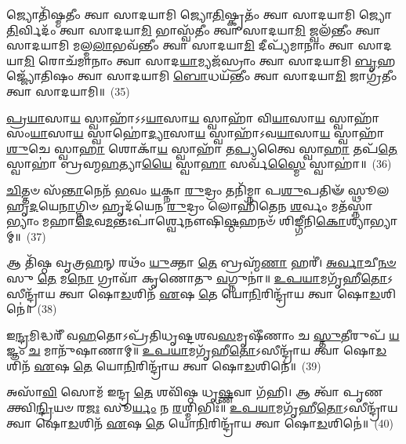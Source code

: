 {\anuvakamend[{\-\ul{𑌈}\-𑌯𑍁𑌰𑍇\-\ul{𑌕𑌾}\-𑌨𑍍𑌨𑌵𑌿𑍞᳴𑌶𑌤𑌿𑌃}]}%

𑌜𑍍𑌯𑍋𑌤𑌿᳴𑌷𑍍𑌮𑌤𑍀𑌂 𑌤𑍍𑌵𑌾 𑌸𑌾𑌦𑌯𑌾𑌮𑌿 𑌜𑍍𑌯𑍋\-\ul{𑌤𑌿}\-𑌷𑍍𑌕𑍃𑌤𑌂᳴ 𑌤𑍍𑌵𑌾 𑌸𑌾𑌦𑌯𑌾𑌮𑌿 𑌜𑍍𑌯𑍋\-\ul{𑌤𑌿}\-𑌰𑍍𑌵𑌿𑌦𑌂᳴ 𑌤𑍍𑌵𑌾 𑌸𑌾𑌦𑌯𑌾\-\ul{𑌮𑌿} 𑌭𑌾𑌸𑍍𑌵᳴𑌤𑍀𑌂 𑌤𑍍𑌵𑌾 𑌸𑌾𑌦𑌯𑌾\-\ul{𑌮𑌿} 𑌜𑍍𑌵𑌲᳴𑌨𑍍𑌤𑍀𑌂 𑌤𑍍𑌵𑌾 𑌸𑌾𑌦𑌯𑌾𑌮𑌿 𑌮𑌲𑍍𑌮\-\ul{𑌲𑌾}\-𑌭𑌵᳴𑌨𑍍𑌤𑍀𑌂 𑌤𑍍𑌵𑌾 𑌸𑌾𑌦𑌯𑌾\-\ul{𑌮𑌿} 𑌦𑍀𑌪𑍍𑌯᳴𑌮𑌾𑌨𑌾𑌂 𑌤𑍍𑌵𑌾 𑌸𑌾𑌦𑌯𑌾\-\ul{𑌮𑌿} 𑌰𑍋𑌚᳴𑌮𑌾𑌨𑌾𑌂 𑌤𑍍𑌵𑌾 𑌸𑌾𑌦\-\ul{𑌯𑌾}\-𑌮𑍍𑌯𑌜᳴𑌸𑍍𑌰𑌾𑌂 𑌤𑍍𑌵𑌾 𑌸𑌾𑌦𑌯𑌾𑌮𑌿 \ul{𑌬𑍃}\-𑌹𑌜𑍍𑌜𑍍𑌯𑍋᳴𑌤𑌿𑌷𑌂 𑌤𑍍𑌵𑌾 𑌸𑌾𑌦𑌯𑌾𑌮𑌿 \ul{𑌬𑍋}\-𑌧𑌯᳴𑌨𑍍𑌤𑍀𑌂 𑌤𑍍𑌵𑌾 𑌸𑌾𑌦𑌯𑌾\-\ul{𑌮𑌿} 𑌜𑌾𑌗𑍍𑌰᳴𑌤𑍀𑌂 𑌤𑍍𑌵𑌾 𑌸𑌾𑌦𑌯𑌾𑌮𑌿॥~(35)

{\anuvakamend[{𑌜𑍍𑌯𑍋𑌤𑌿᳴𑌷𑍍𑌮\-\ul{𑌤𑍀}\-\-\ul{𑍞} 𑌷𑌟𑍍𑌤𑍍𑌰𑌿𑍞᳴𑌶𑌤𑍍}]}%

\-\ul{𑌪𑍍𑌰}\-\-\ul{𑌯𑌾}\-𑌸𑌾\-\ul{𑌯} 𑌸𑍍𑌵𑌾𑌹𑌾᳴\-𑌽\-𑌽\-\ul{𑌯𑌾}\-𑌸𑌾\-\ul{𑌯} 𑌸𑍍𑌵𑌾𑌹𑌾᳴ 𑌵𑌿\-\ul{𑌯𑌾}\-𑌸𑌾\-\ul{𑌯} 𑌸𑍍𑌵𑌾𑌹𑌾᳴ 𑌸𑌂\-\ul{𑌯𑌾}\-𑌸𑌾\-\ul{𑌯} 𑌸𑍍𑌵𑌾𑌹𑍋॑\-\ul{𑌦𑍍𑌯𑌾}\-𑌸𑌾\-\ul{𑌯} 𑌸𑍍𑌵𑌾𑌹𑌾᳴\-𑌽𑌵\-\ul{𑌯𑌾}\-𑌸𑌾\-\ul{𑌯} 𑌸𑍍𑌵𑌾𑌹𑌾᳴ \ul{𑌶𑍁}\-𑌚𑍇 𑌸𑍍𑌵𑌾\-\ul{𑌹𑌾} 𑌶𑍋𑌕𑌾᳴\-\ul{𑌯} 𑌸𑍍𑌵𑌾𑌹𑌾᳴ 𑌤\-\ul{𑌪𑍍𑌯}\-𑌤𑍍𑌵𑍈 𑌸𑍍𑌵𑌾\-\ul{𑌹𑌾} 𑌤𑌪᳴\-\ul{𑌤𑍇} 𑌸𑍍𑌵𑌾𑌹𑌾॑ 𑌬𑍍𑌰𑌹𑍍𑌮\-\ul{𑌹}\-𑌤𑍍𑌯𑌾\-\ul{𑌯𑍈} 𑌸𑍍𑌵𑌾\-\ul{𑌹𑌾} 𑌸𑌰𑍍𑌵᳴\-\ul{𑌸𑍍𑌮𑍈} 𑌸𑍍𑌵𑌾𑌹𑌾॑॥~(36)

{\anuvakamend[{\-\ul{𑌪𑍍𑌰}\-\-\ul{𑌯𑌾}\-𑌸𑌾\-\ul{𑌯} 𑌚𑌤𑍁᳴𑌰𑍍𑌵𑌿𑍞𑌶𑌤𑌿𑌃}]}%

\-\ul{𑌚𑌿}\-𑌤𑍍𑌤𑍞 𑌸᳴\-\ul{𑌨𑍍𑌤𑌾}\-𑌨𑍇𑌨᳴ \ul{𑌭}\-𑌵𑌂 \ul{𑌯}\-𑌕𑍍𑌨𑌾 \ul{𑌰𑍁}\-𑌦𑍍𑌰𑌂 𑌤𑌨𑌿᳴𑌮𑍍𑌨𑌾 𑌪\-\ul{𑌶𑍁}\-𑌪𑌤𑌿𑍟᳴ 𑌸𑍍𑌥𑍂𑌲𑌹𑍃\-\ul{𑌦}\-𑌯𑍇\-\ul{𑌨𑌾}\-𑌗𑍍𑌨𑌿𑍞 𑌹𑍃𑌦᳴𑌯𑍇𑌨 \ul{𑌰𑍁}\-𑌦𑍍𑌰𑌂 𑌲𑍋𑌹𑌿᳴𑌤𑍇𑌨 \ul{𑌶}\-𑌰𑍍𑌵𑌂 𑌮𑌤᳴𑌸𑍍𑌨𑌾𑌭𑍍𑌯𑌾𑌂 𑌮𑌹𑌾\-\ul{𑌦𑍇}\-𑌵\-\ul{𑌮}\-𑌨𑍍𑌤𑌃𑌪𑌾॑𑌰𑍍𑌶𑍍𑌵𑍇𑌨𑍗𑌷𑌿\-\ul{𑌷𑍍𑌠}\-𑌹𑌨𑍞᳴ 𑌶𑌿𑌙𑍍𑌗𑍀𑌨𑌿\-\ul{𑌕𑍋}\-𑌶𑍍𑌯𑌾॑𑌭𑍍𑌯𑌾𑌮𑍍॥~(37)

{\anuvakamend[{\-\ul{𑌚𑌿}\-𑌤𑍍𑌤\-\ul{𑌮}\-𑌷𑍍𑌟𑌾𑌦᳴𑌶}]}%

𑌆 𑌤𑌿᳴𑌷𑍍𑌠 𑌵𑍃𑌤𑍍𑌰\-\ul{𑌹}\-𑌨𑍍 𑌰𑌥𑌂᳴ \ul{𑌯𑍁}\-𑌕𑍍𑌤𑌾 \ul{𑌤𑍇} 𑌬𑍍𑌰𑌹𑍍𑌮᳴\-\ul{𑌣𑌾} 𑌹𑌰𑍀॑। \ul{𑌅}\-\-\ul{𑌰𑍍𑌵𑌾}\-𑌚𑍀\-\ul{𑌨}\-\-\ul{𑍞} 𑌸𑍁 \ul{𑌤𑍇} 𑌮\-\ul{𑌨𑍋} 𑌗𑍍𑌰𑌾𑌵𑌾᳴ 𑌕𑍃𑌣𑍋𑌤𑍁 \ul{𑌵}\-𑌗𑍍𑌨𑍁𑌨𑌾॑॥ \ul{𑌉}\-\-\ul{𑌪}\-\-\ul{𑌯𑌾}\-𑌮𑌗𑍃᳴𑌹𑍀\-\ul{𑌤𑍋}\-\-𑌽𑌸𑍀𑌨𑍍𑌦𑍍𑌰𑌾᳴𑌯 𑌤𑍍𑌵𑌾 𑌷𑍋\-\ul{𑌡}\-𑌶𑌿𑌨᳴ \ul{𑌏}\-𑌷 \ul{𑌤𑍇} 𑌯𑍋\-\ul{𑌨𑌿}\-𑌰𑌿𑌨𑍍𑌦𑍍𑌰𑌾᳴𑌯 𑌤𑍍𑌵𑌾 𑌷𑍋\-\ul{𑌡}\-𑌶𑌿𑌨𑍇॑॥~(38)

{\anuvakamend[{𑌆 𑌤𑌿᳴\-\ul{𑌷𑍍𑌠} 𑌷𑌡𑍍𑌵𑌿𑍞᳴𑌶𑌤𑌿𑌃}]}%

𑌇\-\ul{𑌨𑍍𑌦𑍍𑌰}\-𑌮𑌿𑌦𑍍𑌧𑌰𑍀᳴ 𑌵\-\ul{𑌹}\-𑌤𑍋\-𑌽𑌪𑍍𑌰᳴𑌤𑌿𑌧𑍃𑌷𑍍𑌟𑌶𑌵\-\ul{𑌸}\-𑌮𑍃𑌷𑍀᳴𑌣𑌾𑌂 𑌚 \ul{𑌸𑍍𑌤𑍁}\-𑌤𑍀𑌰𑍁𑌪᳴ \ul{𑌯}\-𑌜𑍍𑌞𑌂 \ul{𑌚} 𑌮𑌾𑌨𑍁᳴𑌷𑌾𑌣𑌾𑌮𑍍॥ \ul{𑌉}\-\-\ul{𑌪}\-\-\ul{𑌯𑌾}\-𑌮𑌗𑍃᳴𑌹𑍀\-\ul{𑌤𑍋}\-\-𑌽𑌸𑍀𑌨𑍍𑌦𑍍𑌰𑌾᳴𑌯 𑌤𑍍𑌵𑌾 𑌷𑍋\-\ul{𑌡}\-𑌶𑌿𑌨᳴ \ul{𑌏}\-𑌷 \ul{𑌤𑍇} 𑌯𑍋\-\ul{𑌨𑌿}\-𑌰𑌿𑌨𑍍𑌦𑍍𑌰𑌾᳴𑌯 𑌤𑍍𑌵𑌾 𑌷𑍋\-\ul{𑌡}\-𑌶𑌿𑌨𑍇॑॥~(39)

{\anuvakamend[{𑌇\-\ul{𑌨𑍍𑌦𑍍𑌰}\-𑌮𑌿𑌤𑍍𑌤𑍍𑌰𑌯𑍋᳴𑌵𑌿𑍞𑌶𑌤𑌿𑌃}]}%

𑌅𑌸𑌾᳴\-\ul{𑌵𑌿} 𑌸𑍋𑌮᳴ 𑌇𑌨𑍍𑌦𑍍𑌰 \ul{𑌤𑍇} 𑌶𑌵𑌿᳴𑌷𑍍𑌠 𑌧𑍃\-\ul{𑌷𑍍𑌣}\-𑌵𑌾 𑌗᳴𑌹𑌿। 𑌆 𑌤𑍍𑌵𑌾᳴ 𑌪𑍃𑌣𑌕𑍍𑌤𑍍𑌵𑌿\-\ul{𑌨𑍍𑌦𑍍𑌰𑌿}\-𑌯𑍞 𑌰\-\ul{𑌜𑌃} 𑌸𑍂\-\ul{𑌰𑍍𑌯𑌂} 𑌨 \ul{𑌰}\-𑌶𑍍𑌮𑌿𑌭𑌿𑌃᳴॥ \ul{𑌉}\-\-\ul{𑌪}\-\-\ul{𑌯𑌾}\-𑌮𑌗𑍃᳴𑌹𑍀\-\ul{𑌤𑍋}\-\-𑌽𑌸𑍀𑌨𑍍𑌦𑍍𑌰𑌾᳴𑌯 𑌤𑍍𑌵𑌾 𑌷𑍋\-\ul{𑌡}\-𑌶𑌿𑌨᳴ \ul{𑌏}\-𑌷 \ul{𑌤𑍇} 𑌯𑍋\-\ul{𑌨𑌿}\-𑌰𑌿𑌨𑍍𑌦𑍍𑌰𑌾᳴𑌯 𑌤𑍍𑌵𑌾 𑌷𑍋\-\ul{𑌡}\-𑌶𑌿𑌨𑍇॑॥~(40)

